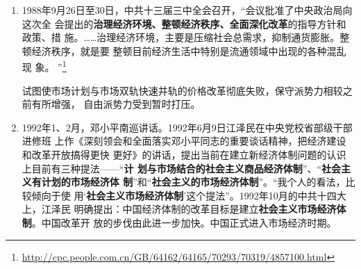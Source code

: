 \begin{enumerate}
  严立贤就此报告中的“\textbf{政府调控市场,市场引导企业}”写到
  \begin{quotation}
    在十二届三中全会，只是强调国家计划必须依据价值规律，而在这里，\textbf{国家计
      划必须通过市场来实现}，也即只能通过市场把企业引导到国家计划上来。这
    样，\textbf{指令性计划必然要退居次要位置}，整个经济体制因此向市场经济迈进了一
    大步。 \footnote{\url{http://jds.cass.cn/ztyj/jjs/201605/t20160506_3324987.shtml}} \end{quotation}

  在马克思所作的科学共产主义重要纲领性文献《哥达纲领批判》中，将共产主义分为共产
  主义初级阶段（即社会主义）和共产主义高级阶段，初级阶段是向高级阶段的过渡
  期。“社会主义初级阶段”其实并不如报告中所说“已经进入社会主义社会”。它不是“共产主
  义初级阶段”，而是向“共产主义初级阶段”过渡前的带有更多资本产权、法权性质的“前社会
  主义阶段”。

  据张曙光，“我国处于什么样的阶段”的最早争论始自1979年2月5日苏绍智、冯兰瑞在理
  论工作务虚会上的报告《无产阶级取得政权后的社会发展阶段问题
  》。

  笔者认为，若要更直白、更方便大众理解的话，可将“社会主义初级阶段”替换为带有更
  多国家资本主义性质，但是为迈入社会主义的阶段所不得不经历的阶段。事实上，不管苏
  俄或者中国之前左的程度如何或它们如何宣称，始终都未曾脱离国家资本主义主体的范畴，
  列宁在战时共产主义失败后对此具有较为清醒认识。在社会主义国家阵营的实践中，马恩
  历史唯物主义中所说的“物质生活条件、生产关系和交换关系的发展程度”成为无法跨越
  的卡夫卡峡谷。这次大会关于生产关系等的认识虽然带有政治因素但可说是理论较为准确。

  赵紫阳本次大会报告上提出“一个中心”——以经济建设为中心，将坚持四项基本原则和坚
  持改革开放列为两个基本点。 据赵紫阳《改革历程》记载，邓力群、胡乔木、王忍之等保
  守派在中共十三大之前对“一个中心，两个基本点”意见较大，他们认为应当坚持“四项基本
  原则为纲，改革开放为目。”


\item 1988年9月26日至30日，中共十三届三中全会召开，“会议批准了中央政治局向这次全
  会提出的\textbf{治理经济环境、整顿经济秩序、全面深化改革}的指导方针和政策、措
  施。……治理经济环境，主要是压缩社会总需求，抑制通货膨胀。整顿经济秩序，就是要
  整顿目前经济生活中特别是流通领域中出现的各种混乱现
  象。
  ”\footnote{\url{http://cpc.people.com.cn/GB/64162/64165/70293/70319/4857100.html}}

  试图使市场计划与市场双轨快速并轨的价格改革彻底失败，保守派势力相较之前有所增强，
  自由派势力受到暂时打压。

\item 1992年1、2月，邓小平南巡讲话。1992年6月9日江泽民在中央党校省部级干部进修班
  上作《深刻领会和全面落实邓小平同志的重要谈话精神，把经济建设和改革开放搞得更快
  更好》的讲话，提出当前在建立新经济体制问题的认识上目前有三种提法——“\textbf{计
    划与市场结合的社会主义商品经济体制}”、“\textbf{社会主义有计划的市场经济体
    制}”和“\textbf{社会主义的市场经济体制}”。“我个人的看法，比较倾向于使
  用‘\textbf{社会主义市场经济体制}’这个提法”。1992年10月的中共十四大上，江泽民
  明确提出：中国经济体制的改革目标是建立\textbf{社会主义市场经济体制}。中国改革开
  放的步伐由此进一步加快。中国正式进入市场经济时期。
\end{enumerate}

